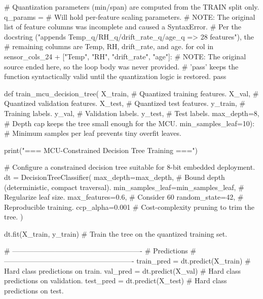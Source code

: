     # Quantization parameters (min/span) are computed from the TRAIN split only.
    q_params = {}                          # Will hold per-feature scaling parameters.
    # NOTE: The original list of feature columns was incomplete and caused a SyntaxError.
    # Per the docstring ("appends Temp_q/RH_q/drift_rate_q/age_q => 28 features"), the
    # remaining columns are Temp, RH, drift_rate, and age.
    for col in sensor_cols_24 + ["Temp", "RH", "drift_rate", "age"]:
        # NOTE: The original source ended here, so the loop body was never provided.
        # 'pass' keeps the function syntactically valid until the quantization logic is restored.
        pass


def train_mcu_decision_tree(
        X_train,                           # Quantized training features.
        X_val,                             # Quantized validation features.
        X_test,                            # Quantized test features.
        y_train,                           # Training labels.
        y_val,                             # Validation labels.
        y_test,                            # Test labels.
        max_depth=8,                       # Depth cap keeps the tree small enough for the MCU.
        min_samples_leaf=10):              # Minimum samples per leaf prevents tiny overfit leaves.

    print("\n=== MCU-Constrained Decision Tree Training ===")

    # Configure a constrained decision tree suitable for 8-bit embedded deployment.
    dt = DecisionTreeClassifier(
        max_depth=max_depth,               # Bound depth (deterministic, compact traversal).
        min_samples_leaf=min_samples_leaf, # Regularize leaf size.
        max_features=0.6,                  # Consider 60%
        random_state=42,                   # Reproducible training.
        ccp_alpha=0.001                    # Cost-complexity pruning to trim the tree.
    )

    dt.fit(X_train, y_train)               # Train the tree on the quantized training set.

    # -------------------------------------------------------
    # Predictions
    # -------------------------------------------------------
    train_pred = dt.predict(X_train)       # Hard class predictions on train.
    val_pred = dt.predict(X_val)           # Hard class predictions on validation.
    test_pred = dt.predict(X_test)         # Hard class predictions on test.

